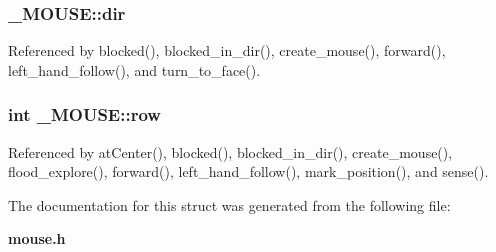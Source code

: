 \subsubsection[{dir}]{ \-\_\-\-M\-O\-U\-S\-E\-::dir}\label{struct__MOUSE_a53f0244726c310c83c8fc413757252ff}


Referenced by blocked(), blocked\-\_\-in\-\_\-dir(), create\-\_\-mouse(), forward(), left\-\_\-hand\-\_\-follow(), and turn\-\_\-to\-\_\-face().

\subsubsection[{row}]{\setlength{\rightskip}{0pt plus 5cm}int \-\_\-\-M\-O\-U\-S\-E\-::row}\label{struct__MOUSE_aae94539440c5448fbda17b54fd6119ac}


Referenced by at\-Center(), blocked(), blocked\-\_\-in\-\_\-dir(), create\-\_\-mouse(), flood\-\_\-explore(), forward(), left\-\_\-hand\-\_\-follow(), mark\-\_\-position(), and sense().



The documentation for this struct was generated from the following file\-:\begin{DoxyCompactItemize}
\item 
{\bf mouse.\-h}\end{DoxyCompactItemize}
